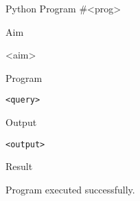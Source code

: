 \documentclass[12pt, a4]{article}
\begin{document}
{\color{turquoise}
\begin{center} {\huge Python Program \#<prog>\par } \end{center}
}
\medskip

\hrulefill

\bigskip

{\color{turquoise}\large Aim \par}
\medskip
\begin{adjustwidth}{2cm}{}
	<aim>
\end{adjustwidth}
\bigskip
\medskip

{\color{turquoise}\large Program \par}
\medskip
\begin{adjustwidth}{2cm}{}
\begin{verbatim}
<query>
\end{verbatim}
\end{adjustwidth}

{\color{turquoise}\large Output \par}
\medskip
{
\begin{adjustwidth}{2cm}{}
\begin{BVerbatim}
<output>
\end{BVerbatim}
\end{adjustwidth}
}
\bigskip
\medskip

{\color{turquoise}\large Result \par}
\medskip
\begin{adjustwidth}{2cm}{}
	Program executed successfully.
\end{adjustwidth}
\end{document}
